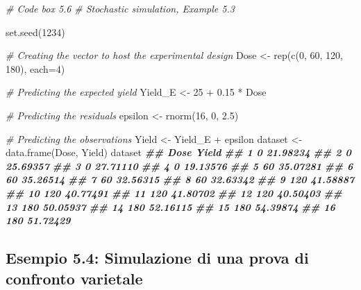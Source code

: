 \documentclass[
  12pt,
]{book}
\newenvironment{Shaded}{\begin{snugshade}}{\end{snugshade}}
\newcommand{\AttributeTok}[1]{\textcolor[rgb]{0.77,0.63,0.00}{#1}}
\newcommand{\CommentTok}[1]{\textcolor[rgb]{0.56,0.35,0.01}{\textit{#1}}}
\newcommand{\DecValTok}[1]{\textcolor[rgb]{0.00,0.00,0.81}{#1}}
\newcommand{\DocumentationTok}[1]{\textcolor[rgb]{0.56,0.35,0.01}{\textbf{\textit{#1}}}}
\newcommand{\FloatTok}[1]{\textcolor[rgb]{0.00,0.00,0.81}{#1}}
\newcommand{\FunctionTok}[1]{\textcolor[rgb]{0.00,0.00,0.00}{#1}}
\newcommand{\NormalTok}[1]{#1}
\newcommand{\OtherTok}[1]{\textcolor[rgb]{0.56,0.35,0.01}{#1}}
\newcommand{\SpecialCharTok}[1]{\textcolor[rgb]{0.00,0.00,0.00}{#1}}
\begin{document}
\begin{Shaded}
\begin{Highlighting}[]
\CommentTok{\# Code box 5.6}
\CommentTok{\# Stochastic simulation, Example 5.3}

\FunctionTok{set.seed}\NormalTok{(}\DecValTok{1234}\NormalTok{)}

\CommentTok{\# Creating the vector to host the experimental design}
\NormalTok{Dose }\OtherTok{\textless{}{-}} \FunctionTok{rep}\NormalTok{(}\FunctionTok{c}\NormalTok{(}\DecValTok{0}\NormalTok{, }\DecValTok{60}\NormalTok{, }\DecValTok{120}\NormalTok{, }\DecValTok{180}\NormalTok{), }\AttributeTok{each=}\DecValTok{4}\NormalTok{)}

\CommentTok{\# Predicting the expected yield}
\NormalTok{Yield\_E }\OtherTok{\textless{}{-}} \DecValTok{25} \SpecialCharTok{+} \FloatTok{0.15} \SpecialCharTok{*}\NormalTok{ Dose}

\CommentTok{\# Predicting the residuals}
\NormalTok{epsilon }\OtherTok{\textless{}{-}} \FunctionTok{rnorm}\NormalTok{(}\DecValTok{16}\NormalTok{, }\DecValTok{0}\NormalTok{, }\FloatTok{2.5}\NormalTok{)}

\CommentTok{\# Predicting the observations}
\NormalTok{Yield }\OtherTok{\textless{}{-}}\NormalTok{ Yield\_E }\SpecialCharTok{+}\NormalTok{ epsilon}
\NormalTok{dataset }\OtherTok{\textless{}{-}} \FunctionTok{data.frame}\NormalTok{(Dose, Yield)}
\NormalTok{dataset}
\DocumentationTok{\#\#    Dose    Yield}
\DocumentationTok{\#\# 1     0 21.98234}
\DocumentationTok{\#\# 2     0 25.69357}
\DocumentationTok{\#\# 3     0 27.71110}
\DocumentationTok{\#\# 4     0 19.13576}
\DocumentationTok{\#\# 5    60 35.07281}
\DocumentationTok{\#\# 6    60 35.26514}
\DocumentationTok{\#\# 7    60 32.56315}
\DocumentationTok{\#\# 8    60 32.63342}
\DocumentationTok{\#\# 9   120 41.58887}
\DocumentationTok{\#\# 10  120 40.77491}
\DocumentationTok{\#\# 11  120 41.80702}
\DocumentationTok{\#\# 12  120 40.50403}
\DocumentationTok{\#\# 13  180 50.05937}
\DocumentationTok{\#\# 14  180 52.16115}
\DocumentationTok{\#\# 15  180 54.39874}
\DocumentationTok{\#\# 16  180 51.72429}
\end{Highlighting}
\end{Shaded}

\normalsize

\hypertarget{esempio-5.4-simulazione-di-una-prova-di-confronto-varietale}{%
\subsection{Esempio 5.4: Simulazione di una prova di confronto varietale}\label{esempio-5.4-simulazione-di-una-prova-di-confronto-varietale}}
\end{document}
